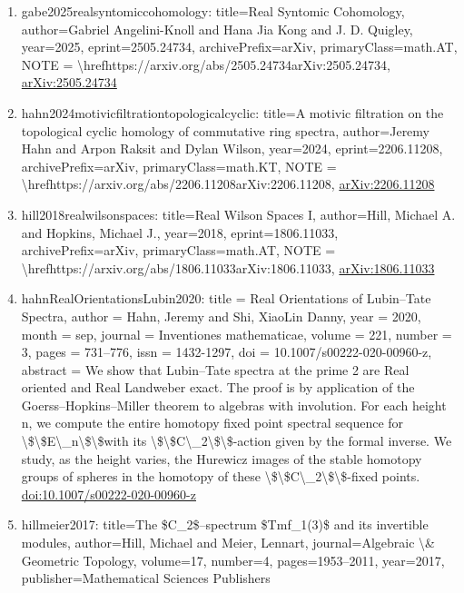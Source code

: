 \documentclass[11pt]{article}
\begin{document}
\begin{enumerate}[leftmargin=*]
  \item gabe2025realsyntomiccohomology: title=Real Syntomic Cohomology, author=Gabriel Angelini-Knoll and Hana Jia Kong and J. D. Quigley, year=2025, eprint=2505.24734, archivePrefix=arXiv, primaryClass=math.AT, NOTE = \textbackslash{}hrefhttps://arxiv.org/abs/2505.24734arXiv:2505.24734, \href{https://arxiv.org/abs/2505.24734}{arXiv:2505.24734}
  \item hahn2024motivicfiltrationtopologicalcyclic: title=A motivic filtration on the topological cyclic homology of commutative ring spectra, author=Jeremy Hahn and Arpon Raksit and Dylan Wilson, year=2024, eprint=2206.11208, archivePrefix=arXiv, primaryClass=math.KT, NOTE = \textbackslash{}hrefhttps://arxiv.org/abs/2206.11208arXiv:2206.11208, \href{https://arxiv.org/abs/2206.11208}{arXiv:2206.11208}
  \item hill2018realwilsonspaces: title=Real Wilson Spaces I, author=Hill, Michael A. and Hopkins, Michael J., year=2018, eprint=1806.11033, archivePrefix=arXiv, primaryClass=math.AT, NOTE = \textbackslash{}hrefhttps://arxiv.org/abs/1806.11033arXiv:1806.11033, \href{https://arxiv.org/abs/1806.11033}{arXiv:1806.11033}
  \item hahnRealOrientationsLubin2020: title = Real Orientations of Lubin--Tate Spectra, author = Hahn, Jeremy and Shi, XiaoLin Danny, year = 2020, month = sep, journal = Inventiones mathematicae, volume = 221, number = 3, pages = 731--776, issn = 1432-1297, doi = 10.1007/s00222-020-00960-z, abstract = We show that Lubin--Tate spectra at the prime 2 are Real oriented and Real Landweber exact. The proof is by application of the Goerss--Hopkins--Miller theorem to algebras with involution. For each height n, we compute the entire homotopy fixed point spectral sequence for \textbackslash{}\$\textbackslash{}\$E\textbackslash{}\_n\textbackslash{}\$\textbackslash{}\$with its \textbackslash{}\$\textbackslash{}\$C\textbackslash{}\_2\textbackslash{}\$\textbackslash{}\$-action given by the formal inverse. We study, as the height varies, the Hurewicz images of the stable homotopy groups of spheres in the homotopy of these \textbackslash{}\$\textbackslash{}\$C\textbackslash{}\_2\textbackslash{}\$\textbackslash{}\$-fixed points. \href{https://doi.org/10.1007/s00222-020-00960-z}{doi:10.1007/s00222-020-00960-z}
  \item hillmeier2017: title=The \$C\_2\$--spectrum \$Tmf\_1(3)\$ and its invertible modules, author=Hill, Michael and Meier, Lennart, journal=Algebraic \textbackslash{}\& Geometric Topology, volume=17, number=4, pages=1953--2011, year=2017, publisher=Mathematical Sciences Publishers

\end{enumerate}
\end{document}
